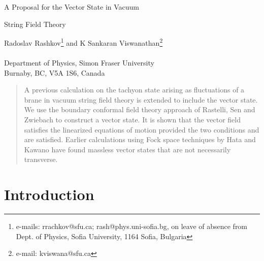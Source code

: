 \documentclass[a4paper,12pt]{article}
\begin{document}
\vspace*{1cm}

\begin{center}
{\bf{\Large A Proposal for the Vector State in Vacuum \\
\vspace*{.35cm}

String Field Theory }}

\vspace*{1cm}

Radoslav Rashkov\footnote{e-mails: rrachkov@sfu.ca; rash@phys.uni-sofia.bg,
on leave of absence from Dept. of Physics, Sofia University, 1164 Sofia,
Bulgaria}
and K Sankaran Viswanathan\footnote{e-mail: kviswana@sfu.ca}\\

\ \\
Department of Physics, Simon Fraser University \\
Burnaby, BC, V5A 1S6, Canada
\end{center}


\vspace*{.8cm}

\begin{abstract}
A previous calculation on the tachyon state arising as fluctuations
of a \coordHE{} brane in vacuum string field theory is extended to include
the vector state. We use the boundary conformal field theory approach
of Rastelli, Sen and Zwiebach to construct a vector state. It is shown
that the vector field satisfies the linearized equations of motion provided 
the two conditions \coordHE{} and \coordHE{} are satisfied. Earlier
calculations using Fock space techniques by Hata and Kawano have found
massless vector states that are not necessarily transverse.
\end{abstract}

\vspace*{.8cm}

\section{Introduction}
\end{document}
